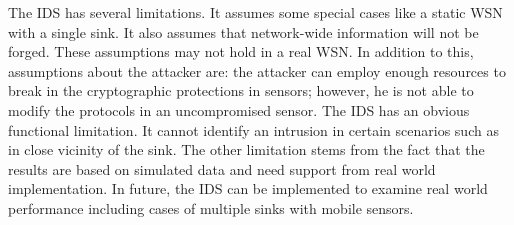 \documentclass[conference]{IEEEtran}
\begin{document}
The IDS has several limitations. 
It assumes some special cases like a static WSN with a single sink.
It also assumes that network-wide information will not be forged. %
These assumptions may not hold in a real WSN.
In addition to this, assumptions about the attacker are: the attacker can employ enough resources to break in the cryptographic protections in sensors; however, he is not able to modify the protocols in an uncompromised sensor.
The IDS has an obvious functional limitation.
It cannot identify an intrusion in certain scenarios such as 
in close vicinity of the sink.%
The other limitation stems from the fact that the results are based on simulated data and need support from real world implementation.
In future,  the IDS can be implemented to examine real world performance including cases of multiple sinks with mobile sensors.






\IEEEtriggercmd{\enlargethispage{-5in}}






\end{document}
